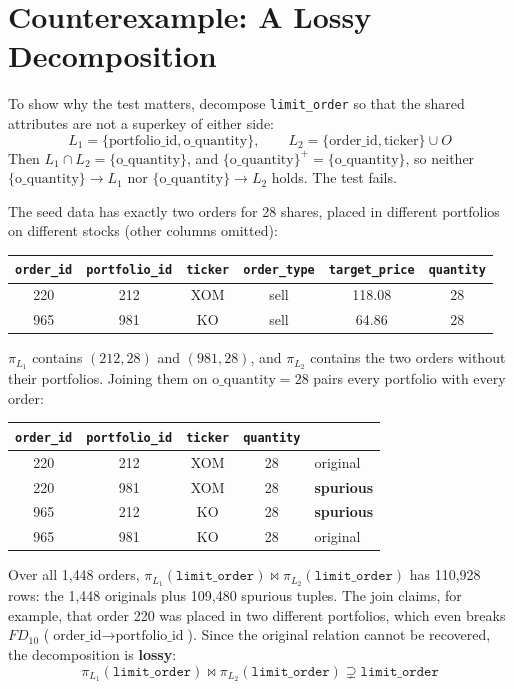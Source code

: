 \documentclass{article}
\newcommand{\at}[1]{\text{#1}}
\newcommand{\cl}[1]{\{#1\}^+}
\begin{document}
\section{Counterexample: A Lossy Decomposition}

To show why the test matters, decompose \texttt{limit\_order} so that the shared attributes are not a superkey of either side:
\[
  L_1 = \{\at{portfolio\_id}, \at{o\_quantity}\}, \qquad L_2 = \{\at{order\_id}, \at{ticker}\} \cup O
\]
Then $L_1 \cap L_2 = \{\at{o\_quantity}\}$, and $\cl{\at{o\_quantity}} = \{\at{o\_quantity}\}$, so neither $\{\at{o\_quantity}\} \rightarrow L_1$ nor $\{\at{o\_quantity}\} \rightarrow L_2$ holds. The test fails.

The seed data has exactly two orders for 28 shares, placed in different portfolios on different stocks (other columns omitted):
\begin{center}
\begin{tabular}{c c c c c c}
  \toprule
  \texttt{order\_id} & \texttt{portfolio\_id} & \texttt{ticker} & \texttt{order\_type} & \texttt{target\_price} & \texttt{quantity} \\
  \midrule
  220 & 212 & XOM & sell & 118.08 & 28 \\
  965 & 981 & KO  & sell & 64.86  & 28 \\
  \bottomrule
\end{tabular}
\end{center}

$\pi_{L_1}$ contains $(212, 28)$ and $(981, 28)$, and $\pi_{L_2}$ contains the two orders without their portfolios. Joining them on $\at{o\_quantity} = 28$ pairs every portfolio with every order:
\begin{center}
\begin{tabular}{c c c c l}
  \toprule
  \texttt{order\_id} & \texttt{portfolio\_id} & \texttt{ticker} & \texttt{quantity} & \\
  \midrule
  220 & 212 & XOM & 28 & original \\
  220 & 981 & XOM & 28 & \textbf{spurious} \\
  965 & 212 & KO  & 28 & \textbf{spurious} \\
  965 & 981 & KO  & 28 & original \\
  \bottomrule
\end{tabular}
\end{center}

Over all 1{,}448 orders, $\pi_{L_1}(\texttt{limit\_order}) \bowtie \pi_{L_2}(\texttt{limit\_order})$ has 110{,}928 rows: the 1{,}448 originals plus 109{,}480 spurious tuples. The join claims, for example, that order 220 was placed in two different portfolios, which even breaks $FD_{10}$ ($\at{order\_id} \rightarrow \at{portfolio\_id}$). Since the original relation cannot be recovered, the decomposition is \textbf{lossy}:
\[
  \pi_{L_1}(\texttt{limit\_order}) \bowtie \pi_{L_2}(\texttt{limit\_order}) \supsetneq \texttt{limit\_order}
\]
\end{document}
